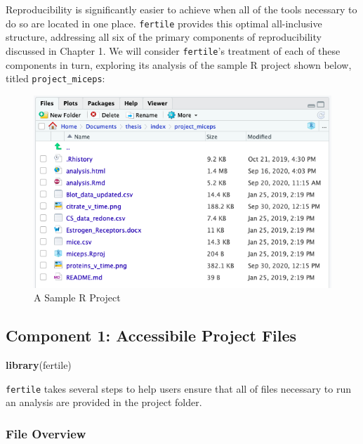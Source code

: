 \documentclass[12pt,twoside]{reedthesis}
\newenvironment{Shaded}{\begin{snugshade}}{\end{snugshade}}
\newcommand{\KeywordTok}[1]{\textcolor[rgb]{0.13,0.29,0.53}{\textbf{#1}}}
\newcommand{\NormalTok}[1]{#1}
\begin{document}
Reproducibility is significantly easier to achieve when all of the tools necessary to do so are located in one place. \texttt{fertile} provides this optimal all-inclusive structure, addressing all six of the primary components of reproducibility discussed in Chapter 1. We will consider \texttt{fertile}'s treatment of each of these components in turn, exploring its analysis of the sample R project shown below, titled \texttt{project\_miceps}:
\begin{figure}
\includegraphics[width=1\linewidth]{figure/sample-project} \caption{A Sample R Project}\label{fig:unnamed-chunk-8}
\end{figure}
\hypertarget{component-1-accessibile-project-files}{%
\subsection{Component 1: Accessibile Project Files}\label{component-1-accessibile-project-files}}
\begin{Shaded}
\begin{Highlighting}[]
\KeywordTok{library}\NormalTok{(fertile)}
\end{Highlighting}
\end{Shaded}
\texttt{fertile} takes several steps to help users ensure that all of files necessary to run an analysis are provided in the project folder.

\hypertarget{file-overview}{%
\subsubsection{File Overview}\label{file-overview}}
\end{document}
